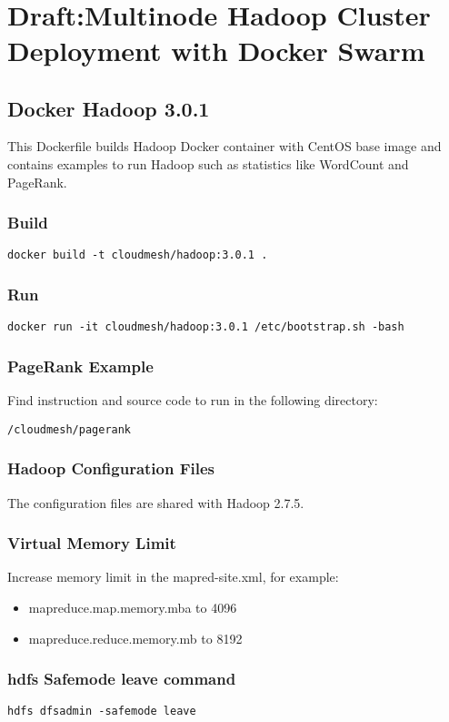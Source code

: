 \MDNAME\

\section{Draft:Multinode Hadoop Cluster Deployment with Docker Swarm}

\subsection{Docker Hadoop 3.0.1}

This Dockerfile builds Hadoop Docker container with CentOS base image
and contains examples to run Hadoop such as statistics like WordCount
and PageRank.

\subsubsection{Build}

\texttt{docker\ build\ -t\ cloudmesh/hadoop:3.0.1\ .}

\subsubsection{Run}

\texttt{docker\ run\ -it\ cloudmesh/hadoop:3.0.1\ /etc/bootstrap.sh\ -bash}

\subsubsection{PageRank Example}

Find instruction and source code to run in the following directory:

\texttt{/cloudmesh/pagerank}

\subsubsection{Hadoop Configuration Files}

The configuration files are shared with Hadoop 2.7.5.

\subsubsection{Virtual Memory Limit}

Increase memory limit in the mapred-site.xml, for example:

\begin{itemize}
\item
  mapreduce.map.memory.mba to 4096
\item
  mapreduce.reduce.memory.mb to 8192
\end{itemize}

\subsubsection{hdfs Safemode leave command}

\texttt{hdfs\ dfsadmin\ -safemode\ leave}

